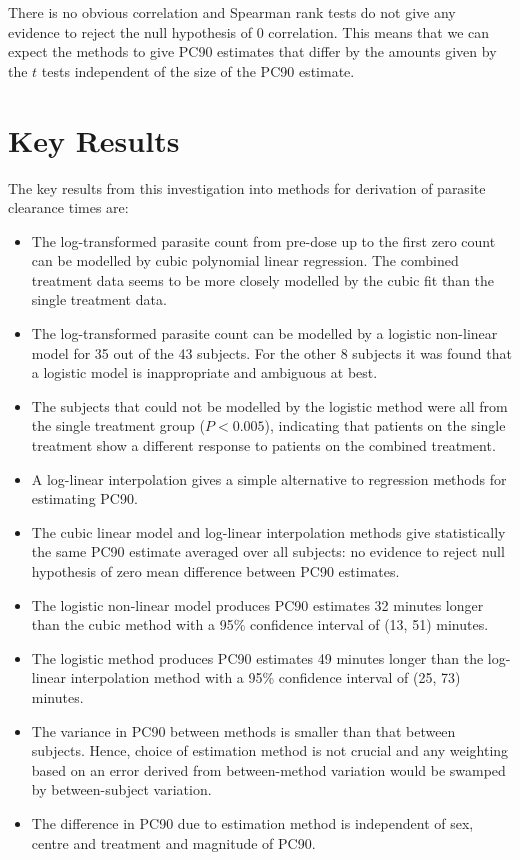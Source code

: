 There is no obvious correlation and Spearman rank tests do not give any evidence to reject the null hypothesis of 0 correlation. This means that we can expect the methods to give PC90 estimates that differ by the amounts given by the $t$ tests independent of the size of the PC90 estimate.
\section{Key Results}
The key results from this investigation into methods for derivation of parasite clearance times are:
\begin{itemize}
\item The log-transformed parasite count from pre-dose up to the first zero count can be modelled by cubic polynomial linear regression. The combined treatment data seems to be more closely modelled by the cubic fit than the single treatment data.
\item The log-transformed parasite count can be modelled by a logistic non-linear model for 35 out of the 43 subjects. For the other 8 subjects it was found that a logistic model is inappropriate and ambiguous at best.
\item The subjects that could not be modelled by the logistic method were all from the single treatment group ($P<0.005$), indicating that patients on the single treatment show a different response to patients on the combined treatment.
\item A log-linear interpolation gives a simple alternative to regression methods for estimating PC90.
\item The cubic linear model and log-linear interpolation methods give statistically the same PC90 estimate averaged over all subjects: no evidence to reject null hypothesis of zero mean difference between PC90 estimates.
\item The logistic non-linear model produces PC90 estimates 32 minutes longer than the cubic method 
with a 95\% confidence interval of (13, 51) minutes.
\item The logistic method produces PC90 estimates 49 minutes longer than the log-linear interpolation method with a 95\% confidence interval of (25, 73) minutes.
\item The variance in PC90 between methods is smaller than that between subjects. Hence, choice of estimation method is not crucial and any weighting based on an error derived from between-method variation would be swamped by between-subject variation.
\item The difference in PC90 due to estimation method is independent of sex, centre and treatment and magnitude of PC90. 
\end{itemize}
